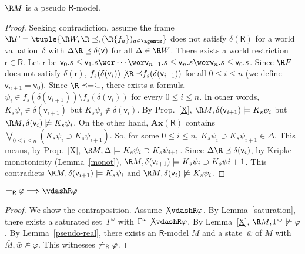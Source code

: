 \documentclass[doctor]{iscs-thesis}
\begin{document}
\begin{lemma}
 $\R M$ is a pseudo $\mathsf R$-model.
\end{lemma}
\begin{proof}
 Seeking contradiction,
 assume the frame $\R F = \tuple{\R W, \R\preceq, (\R
 {f_a})_{a\in\agents}}$
 does not satisfy $\delta(\mathsf R)$ for
 a world valuation~$\delta$ with
 $\Delta\R\preceq\delta(\mathsf v)$ for all $\Delta\in\R W$.
 There exists a world restriction
 $\mathsf r\in\mathsf R$.
 Let $\mathsf r$ be $\mathsf v_0.s\le\mathsf v_1.s\wor\cdots \wor\mathsf
 v_{n-1}.s\le\mathsf v_n.s\wor\mathsf v_n.s\le\mathsf v_0.s$.
 Since $\R F$ does not satisfy $\delta(\mathsf r)$,
 $f_s(\delta(\mathsf v_i))\not{\R \preceq}f_s(\delta(\mathsf v_{i+1}))$
 for
 all $0\le i\le n$ (we define $\mathsf v_{n+1} = \mathsf v_0$).
 Since $\R\preceq = \subseteq$, there exists
 a formula $\psi_i\in f_s(\delta(\mathsf v_{i+1}))\setminus
 f_s(\delta(\mathsf v_i))$ for every $0\le i\le n$.
 In other words, $K_s\psi_i\in\delta(\mathsf v_{i+1})$
 but $K_s\psi_i\notin\delta(\mathsf v_i)$.
 By Prop.~\ref{X},
 $\R M,\delta(\mathsf v_{i+1})\models K_s\psi_i$ but
 $\R M,\delta(\mathsf v_{i})\not\models K_s\psi_i$.
 On the other hand, $\mathbf{Ax}(\mathsf R)$ contains
 $\bigvee_{0\le i\le n}\left(K_s\psi_i\supset K_s\psi_{i+1}\right)$.
 So, for some $0\le i\le n$,
 $K_s\psi_i\supset K_s\psi_{i+1}\in\Delta$.
 This means, by Prop.~\ref{X},
 $\R M,\Delta\models K_s\psi_i\supset K_s\psi_{i+1}$.
 Since $\Delta\R\preceq\delta(\mathsf v_i)$,
 by Kripke monotonicity (Lemma~\ref{monot}),
 $\R M,\delta(\mathsf v_{i+1})\models K_s\psi_i\supset K_s\psi{i+1}$.
 This contradicts $\R M,\delta(\mathsf v_{i+1})\models K_s\psi_i$ and
 $\R M,\delta(\mathsf v_i)\not\models K_s\psi_i$.
\end{proof}
 
\begin{lemma}[Completeness]
 $\modelsR\varphi\Longrightarrow\vdashR\varphi$
\end{lemma}
\begin{proof}
 We show the contraposition.
 Assume $\not\vdashR \varphi$. By
 Lemma~\ref{saturation}, there exists
 a saturated set~$\Gamma^\omega$ with $\Gamma^\omega\not\vdashR\varphi$.
 By Lemma~\ref{X}, $\R M, \Gamma^\omega\not\models\varphi$.
 By Lemma~\ref{pseudo-real}, there exists an
 $\mathsf R$-model $\bar M$ and a state~$\bar w$ of $\bar M$
 with $\bar M,\bar w\not\models \varphi$.
 This witnesses $\not\models_{\mathsf R}\varphi$.
\end{proof}
\end{document}
